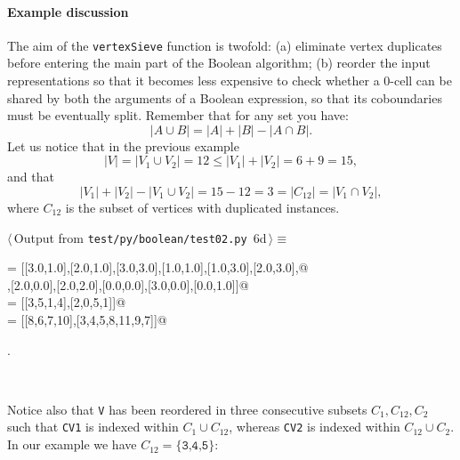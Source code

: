 \documentclass[11pt,oneside]{article}	%
\begin{document}
\paragraph{Example discussion} 
The aim of the \texttt{vertexSieve} function is twofold: (a) eliminate vertex duplicates before entering the main part of the Boolean algorithm; (b) reorder the input representations so that it becomes less expensive to check whether a 0-cell can be shared by both the arguments of a Boolean expression, so that its coboundaries must be eventually split. Remember that for any set you have:
\[
|A\cup B| = |A|+|B|-|A\cap B|.
\]
Let us notice that in the previous example
\[
|V| = |V_1 \cup V_2| = 12 \leq |V_1|+|V_2| = 6+9 = 15,
\]
and that 
\[
|V_1|+|V_2| - |V_1 \cup V_2| = 15 - 12 = 3 = |C_{12}| = |V_1 \cap V_2|,
\]
where $C_{12}$ is the subset of vertices with duplicated instances.
\begin{flushleft} \small
\begin{minipage}{\linewidth} \label{scrap12}
\protect{}$\langle\,$Output from \texttt{test/py/boolean/test02.py}\nobreak\ {\footnotesize 6d}$\,\rangle\equiv$
\vspace{-1ex}
\begin{list}{}{} \item
\mbox{}\verb@V   = [[3.0,1.0],[2.0,1.0],[3.0,3.0],[1.0,1.0],[1.0,3.0],[2.0,3.0],@\\
\mbox{}\verb@       [3.0,2.0],[2.0,0.0],[2.0,2.0],[0.0,0.0],[3.0,0.0],[0.0,1.0]]@\\
\mbox{} = [[3,5,1,4],[2,0,5,1]]@\\
\mbox{} = [[8,6,7,10],[3,4,5,8,11,9,7]]@\\
\mbox{}\verb@@{\NWsep}
\end{list}
\vspace{-1ex}
\footnotesize\addtolength{\baselineskip}{-1ex}
\begin{list}{}{\setlength{\itemsep}{-\parsep}\setlength{\itemindent}{-\leftmargin}}
\item {\NWtxtMacroNoRef}.
\end{list}
\end{minipage}\\[4ex]
\end{flushleft}
Notice also that \texttt{V} has been reordered in three consecutive subsets $C_{1},C_{12},C_{2}$ such that \texttt{CV1} is indexed within $C_{1}\cup C_{12}$, whereas \texttt{CV2} is indexed within $C_{12}\cup C_{2}$. In our example we have  $C_{12}=\{\texttt{3,4,5}\}$: 
\end{document}
